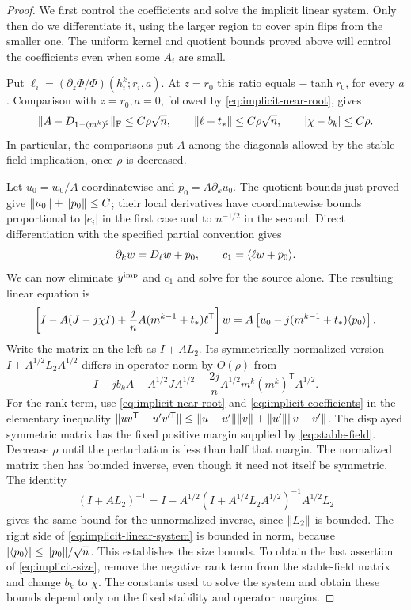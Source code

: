 \begin{proof}
We first control the coefficients and solve the implicit linear system.
Only then do we differentiate it, using the larger region to cover spin
flips from the smaller one. The uniform kernel and quotient bounds proved
above will control the coefficients even when some $A_i$ are small.

Put $\ell_i=(\partial_z\Phi/\Phi)(h_i^k;r_i,a)$.
At $z=r_0$ this ratio equals $-\tanh r_0$, for every $a$.  Comparison
with $z=r_0,a=0$, followed by \eqref{eq:implicit-near-root}, gives
\begin{equation}
 \lVert A-D_{1-(m^k)^2}\rVert_{\mathrm F}\leq C\rho\sqrt n,
 \qquad \lVert \ell+t_*\rVert\leq C\rho\sqrt n,
 \qquad |\chi-b_k|\leq C\rho.
 \label{eq:implicit-coefficients}
\end{equation}
In particular, the comparisons put $A$ among the diagonals allowed by
the stable-field implication, once $\rho$ is decreased.

Let $u_0=w_0/A$ coordinatewise and $p_0=A\partial_k u_0$.  The quotient
bounds just proved give $\lVert u_0\rVert+\lVert p_0\rVert\leq C$; their local
derivatives have coordinatewise bounds proportional to $|e_i|$ in the
first case and to $n^{-1/2}$ in the second.  Direct differentiation with
the specified partial convention gives
\[
 \partial_k w=D_\ell w+p_0,\qquad
 c_1=\langle \ell w+p_0\rangle.
\]
We can now eliminate $y^{\rm imp}$ and $c_1$ and solve for the source
alone. The resulting linear equation is
\begin{equation}
 \left[I-A(J-j\chi I)
       +\frac jn A(m^{k-1}+t_*)\ell^{\mathsf T}\right]w
 =A\left[u_0-j(m^{k-1}+t_*)\langle p_0\rangle\right].
 \label{eq:implicit-linear-system}
\end{equation}
Write the matrix on the left as $I+AL_2$.  Its symmetrically normalized
version $I+A^{1/2}L_2A^{1/2}$ differs in operator norm by $O(\rho)$ from
\[
 I+jb_k A-A^{1/2}JA^{1/2}
       -\frac{2j}{n}A^{1/2}m^k(m^k)^{\mathsf T}A^{1/2}.
\]
For the rank term, use \eqref{eq:implicit-near-root} and
\eqref{eq:implicit-coefficients} in the elementary inequality
$\lVert uv^{\mathsf T}-u'v'^{\mathsf T}\rVert
\leq\lVert u-u'\rVert\lVert v\rVert+\lVert u'\rVert\lVert v-v'\rVert$.
The displayed symmetric matrix has the fixed positive margin supplied
by \eqref{eq:stable-field}. Decrease $\rho$ until the perturbation is less
than half that margin. The normalized matrix then has bounded inverse,
even though it need not itself be symmetric.  The identity
\[
 (I+AL_2)^{-1}
 =I-A^{1/2}(I+A^{1/2}L_2A^{1/2})^{-1}A^{1/2}L_2
\]
gives the same bound for the unnormalized inverse, since $\lVert L_2\rVert$ is
bounded.  The right side of \eqref{eq:implicit-linear-system} is bounded
in norm, because $|\langle p_0\rangle|\leq\lVert p_0\rVert/\sqrt n$.
This establishes the size bounds. To obtain the last assertion of
\eqref{eq:implicit-size}, remove the negative rank term from the stable-field
matrix and change $b_k$ to $\chi$. The constants used to solve the system
and obtain these bounds depend only on the fixed stability and operator
margins.


\end{proof}
